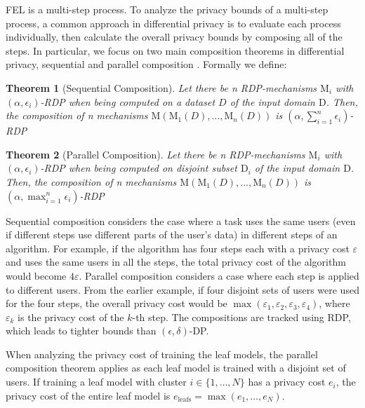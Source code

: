 \documentclass{article}
\newcommand{\eps}{\varepsilon}
\begin{document}
FEL is a multi-step process. To analyze the privacy bounds of a multi-step process, a common approach in differential privacy is to evaluate each process individually, then calculate the overall privacy bounds by composing all of the steps. In particular, we focus on two main composition theorems in differential privacy, sequential and parallel composition \cite{dwork2009differential}. Formally we define:


\textbf{Theorem 1} (Sequential Composition). \textit{Let there be n RDP-mechanisms $\mathrm{M}_i$ with $(\alpha, \epsilon_i)$-RDP when being computed on a dataset $D$ of the input domain $\mathrm{D}$. Then, the composition of n mechanisms $\mathrm{M}(\mathrm{M}_1(D),\dots,\mathrm{M}_n(D))$ is $(\alpha, \sum^n_{i=1} \epsilon_i)$-RDP}


\textbf{Theorem 2} (Parallel Composition). \textit{Let there be n RDP-mechanisms $\mathrm{M}_i$ with $(\alpha, \epsilon_i)$-RDP when being computed on disjoint subset $\mathrm{D}_i$ of the input domain $\mathrm{D}$. Then, the composition of n mechanisms $\mathrm{M}(\mathrm{M}_1(D),\dots,\mathrm{M}_n(D))$ is $(\alpha, \max^n_{i=1} \epsilon_i)$-RDP}

Sequential composition considers the case where a task uses the same users (even if different steps use different parts of the user’s data) in different steps of an algorithm. For example, if the algorithm has four steps each with a privacy cost $\eps$ and uses the same users in all the steps, the total privacy cost of the algorithm would become $4\eps$.
%
Parallel composition considers a case where each step is applied to different users. From the earlier example, if four disjoint sets of users were used for the four steps, the overall privacy cost would be $\max(\eps_1,\eps_2,\eps_3,\eps_4)$, where $\eps_k$ is the privacy cost of the $k$-th step. The compositions are tracked using RDP, which leads to tighter bounds than $(\epsilon, \delta)$-DP.

When analyzing the privacy cost of training the leaf models, the parallel composition theorem applies as each leaf model is trained with a disjoint set of users. If training a leaf model with cluster $i \in \{1,\dots,N\}$ has a privacy cost $e_i$, the privacy cost of the entire leaf model is $e_\mathrm{leafs} = \max(e_1,\dots, e_N)$.
\end{document}
